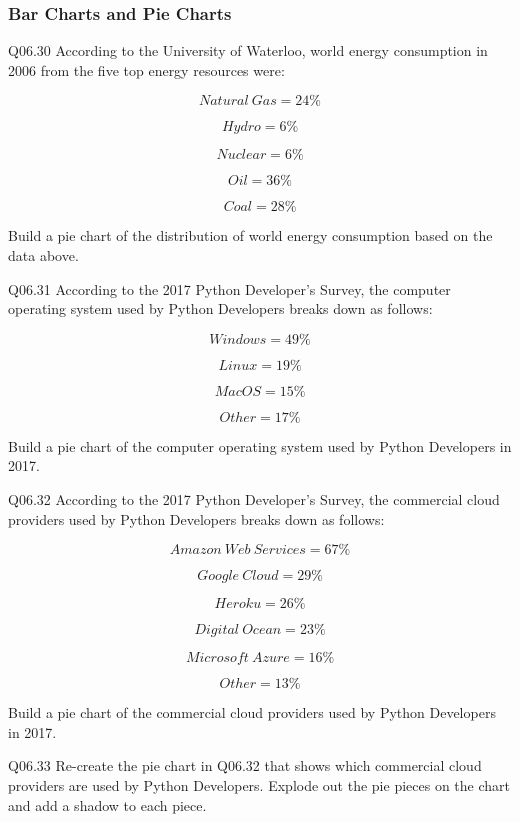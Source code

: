 \documentclass{book}
\newenvironment{problems}{}{}  %
\begin{document}
    




    
        \hypertarget{bar-charts-and-pie-charts}{%
\subsubsection{Bar Charts and Pie
Charts}\label{bar-charts-and-pie-charts}}
    




    
        \begin{problems}
        Q06.30 According to the University of Waterloo, world energy consumption
in 2006 from the five top energy resources were:

\[ Natural \ Gas = 24\% \]

\[ Hydro = 6\% \]

\[ Nuclear = 6\% \]

\[ Oil = 36\% \]

\[ Coal = 28\% \]

Build a pie chart of the distribution of world energy consumption based
on the data above.

Q06.31 According to the 2017 Python Developer's Survey, the computer
operating system used by Python Developers breaks down as follows:

\[ Windows = 49\% \]

\[ Linux = 19\% \]

\[ MacOS = 15\% \]

\[ Other = 17\% \]

Build a pie chart of the computer operating system used by Python
Developers in 2017.

Q06.32 According to the 2017 Python Developer's Survey, the commercial
cloud providers used by Python Developers breaks down as follows:

\[ Amazon \ Web \ Services = 67\% \]

\[ Google \ Cloud = 29\% \]

\[ Heroku = 26\% \]

\[ Digital \ Ocean = 23\% \]

\[ Microsoft \ Azure = 16\% \]

\[ Other = 13\% \]

Build a pie chart of the commercial cloud providers used by Python
Developers in 2017.

Q06.33 Re-create the pie chart in Q06.32 that shows which commercial
cloud providers are used by Python Developers. Explode out the pie
pieces on the chart and add a shadow to each piece.


\end{problems}
\end{document}
